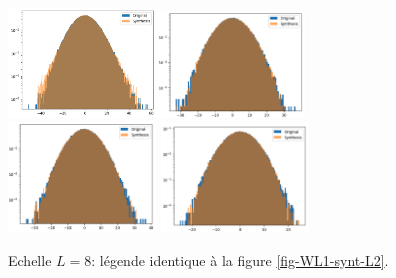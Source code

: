\documentclass[12pt,twoside]{article}
\begin{document}
\begin{figure}
\centering
\includegraphics[width=0.35\textwidth]{fig-WL1-synt-L8-pixelval.png}\includegraphics[width=0.35\textwidth]{fig-WL1-synt-L8-details_1.png}\\
\includegraphics[width=0.35\textwidth]{fig-WL1-synt-L8-details_2.png}
\includegraphics[width=0.35\textwidth]{fig-WL1-synt-L8-details_3.png}
\caption{Echelle $L=8$: légende identique à la figure \ref{fig-WL1-synt-L2}.}
\label{fig-WL1-synt-L8}
\end{figure}
\end{document}
